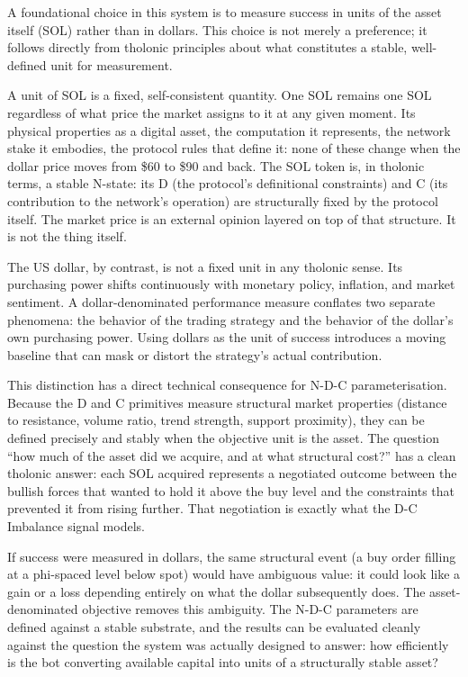 \documentclass[
  11pt,
  letterpaper,
]{article}
\begin{document}
A foundational choice in this system is to measure success in units of
the asset itself (SOL) rather than in dollars. This choice is not merely
a preference; it follows directly from tholonic principles about what
constitutes a stable, well-defined unit for measurement.

A unit of SOL is a fixed, self-consistent quantity. One SOL remains one
SOL regardless of what price the market assigns to it at any given
moment. Its physical properties as a digital asset, the computation it
represents, the network stake it embodies, the protocol rules that
define it: none of these change when the dollar price moves from \$60 to
\$90 and back. The SOL token is, in tholonic terms, a stable N-state:
its D (the protocol's definitional constraints) and C (its contribution
to the network's operation) are structurally fixed by the protocol
itself. The market price is an external opinion layered on top of that
structure. It is not the thing itself.

The US dollar, by contrast, is not a fixed unit in any tholonic sense.
Its purchasing power shifts continuously with monetary policy,
inflation, and market sentiment. A dollar-denominated performance
measure conflates two separate phenomena: the behavior of the trading
strategy and the behavior of the dollar's own purchasing power. Using
dollars as the unit of success introduces a moving baseline that can
mask or distort the strategy's actual contribution.

This distinction has a direct technical consequence for N-D-C
parameterisation. Because the D and C primitives measure structural
market properties (distance to resistance, volume ratio, trend strength,
support proximity), they can be defined precisely and stably when the
objective unit is the asset. The question ``how much of the asset did we
acquire, and at what structural cost?'' has a clean tholonic answer:
each SOL acquired represents a negotiated outcome between the bullish
forces that wanted to hold it above the buy level and the constraints
that prevented it from rising further. That negotiation is exactly what
the D-C Imbalance signal models.

If success were measured in dollars, the same structural event (a buy
order filling at a phi-spaced level below spot) would have ambiguous
value: it could look like a gain or a loss depending entirely on what
the dollar subsequently does. The asset-denominated objective removes
this ambiguity. The N-D-C parameters are defined against a stable
substrate, and the results can be evaluated cleanly against the question
the system was actually designed to answer: how efficiently is the bot
converting available capital into units of a structurally stable asset?
\end{document}
